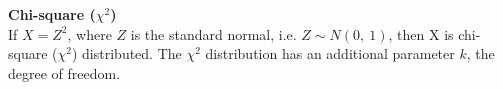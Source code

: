 \documentclass[a4paper]{article}
\newcommand{\subheading}[1]{{\scriptsize\textbf{#1}}}
\begin{document}
\begin{multicols*}{4}
\subheading{Chi-square ($\chi^2$)}\\
If $X = Z^2$, where $Z$ is the standard normal, i.e. $Z\sim N(0,\ 1)$,
then X is chi-square ($\chi^2$) distributed. The $\chi^2$ distribution
has an additional parameter $k$, the degree of freedom.


\end{multicols*}
\end{document}
